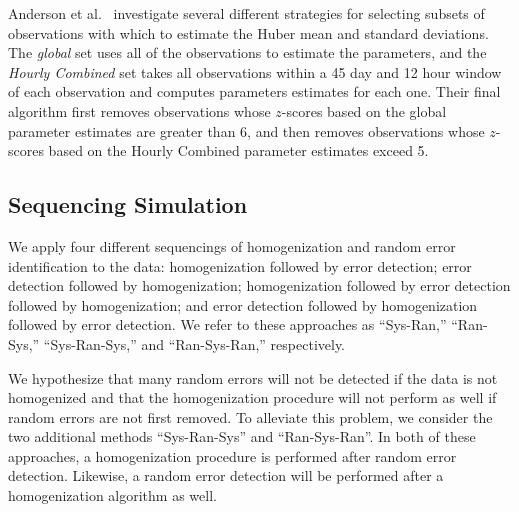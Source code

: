 \documentclass[12pt]{article}
\begin{document}
\begin{doublespacing}
Anderson et al.~\cite{bell14} investigate several different strategies for selecting subsets of observations with which to estimate the Huber mean and standard deviations.  The \emph{global} set uses all of the observations to estimate the parameters, and the \emph{Hourly Combined} set takes all observations within  a 45 day and 12 hour window of each observation and computes parameters estimates for each one.  Their final algorithm first removes observations whose $z$-scores based on the global parameter estimates are greater than 6, and then removes observations whose $z$-scores  based on the Hourly Combined parameter estimates exceed 5.  


\subsection{Sequencing Simulation}

We apply four different sequencings of homogenization and random error identification to the data: homogenization followed by error detection; error detection followed by homogenization; homogenization followed by error detection followed by homogenization; and error detection followed by homogenization followed by error detection.  We refer to these approaches as ``Sys-Ran,'' ``Ran-Sys,'' ``Sys-Ran-Sys,'' and ``Ran-Sys-Ran,'' respectively.

We hypothesize that many random errors will not be detected if the data is not homogenized and that the homogenization procedure will not perform as well if random errors are not first removed.  To alleviate this problem, we consider the two additional methods ``Sys-Ran-Sys'' and ``Ran-Sys-Ran''.  In both of these approaches, a homogenization procedure is performed after random error detection.  Likewise, a random error detection will be performed after a homogenization algorithm as well.














\end{doublespacing}
\end{document}
